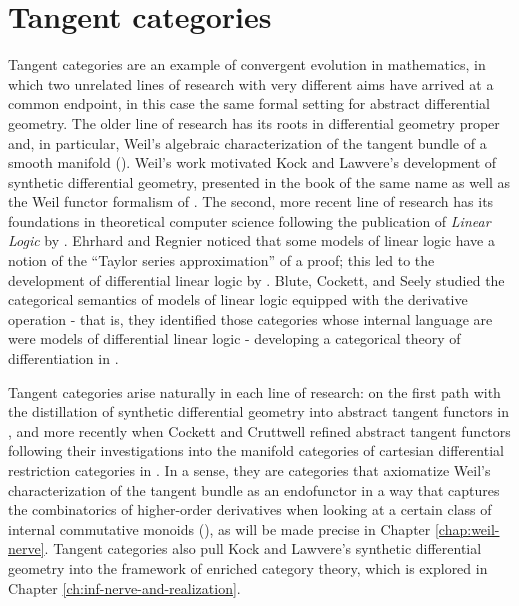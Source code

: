 
% 

\chapter{Tangent categories}%
\label{ch:tangent_categories}

Tangent categories are an example of convergent evolution in mathematics, in which two unrelated lines of research with very different aims have arrived at a common endpoint, in this case the same formal setting for abstract differential geometry. The older line of research has its roots in differential geometry proper and, in particular, Weil's algebraic characterization of the tangent bundle of a smooth manifold (\cite{Weil1953}). Weil's work motivated Kock and Lawvere's development of synthetic differential geometry, presented in the book of the same name \cite{Lawvere1979,Kock2006} as well as the Weil functor formalism of \cite{Kolar1993}. The second, more recent line of research has its foundations in theoretical computer science following the publication of \emph{Linear Logic} by \cite{girard1987linear}. Ehrhard and Regnier noticed that some models of linear logic have a notion of the ``Taylor series approximation'' of a proof; this led to the development of differential linear logic by \cite{ehrhard2003differential}. Blute, Cockett, and Seely studied the categorical semantics of models of linear logic equipped with the derivative operation - that is, they identified those categories whose internal language are were models of differential linear logic - developing a categorical theory of differentiation in \cite{blute2006differential,Blute2009}.


Tangent categories arise naturally in each line of research: on the first path with the distillation of synthetic differential geometry into abstract tangent functors in \cite{Rosicky1984}, and more recently when Cockett and Cruttwell refined abstract tangent functors following their investigations into the manifold categories of cartesian differential restriction categories in \cite{MR2861119,Cockett2014}. In a sense, they are categories that axiomatize Weil's characterization of the tangent bundle as an endofunctor in a way that captures the combinatorics of higher-order derivatives when looking at a certain class of internal commutative monoids (\cite{cockett2011faa}), as will be made precise in Chapter \ref{chap:weil-nerve}. Tangent categories also pull Kock and Lawvere's synthetic differential geometry into the framework of enriched category theory, which is explored in Chapter \ref{ch:inf-nerve-and-realization}.

